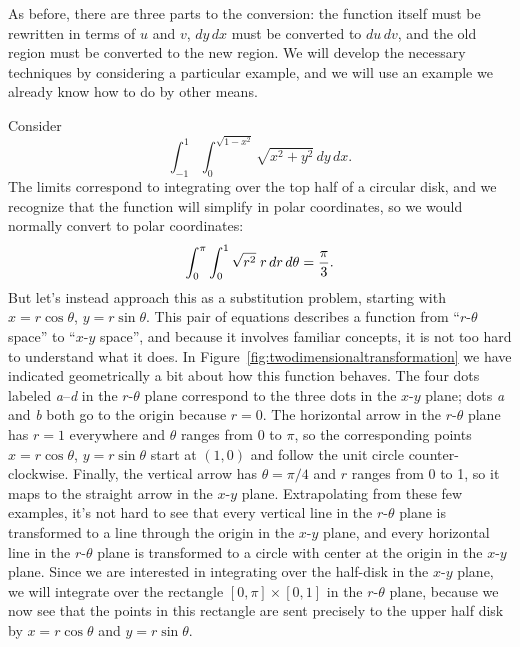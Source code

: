 As before, there are three parts to the conversion: the function
itself must be rewritten in terms of $u$ and $v$, $dy\,dx$ must be
converted to $du\,dv$, and the old region must be converted to the new
region. We will develop the necessary techniques by considering a
particular example, and we will use an example we already know how to
do by other means.

Consider 
\[\int_{-1}^1\int_0^{\sqrt{1-x^2}} \sqrt{x^2+y^2}\,dy\,dx.\]
The limits correspond to integrating over the top half of a circular
disk, and we recognize that the function will simplify in polar
coordinates, so we would normally convert to polar coordinates:
\[\int_{0}^\pi\int_0^1 \sqrt{r^2}\;r\,dr\,d\theta={\pi\over3}.\]
But let's instead approach this as a substitution problem, starting
with $x=r\cos\theta$, $y=r\sin\theta$. This pair of equations
describes a function from ``$r$-$\theta$ space'' to ``$x$-$y$ space'',
and because it involves familiar concepts, it is not too hard to
understand what it does. In Figure~\ref{fig:twodimensionaltransformation}
we have indicated geometrically a bit about how this
function behaves. The four dots labeled \emph{a}--\emph{d} in the $r$-$\theta$ plane
correspond to the three dots in the $x$-$y$ plane; dots \emph{a} and 
\emph{b} both go to the origin because $r=0$. The horizontal arrow in the
$r$-$\theta$ plane has $r=1$ everywhere and $\theta$ ranges from 0 to
$\pi$, so the corresponding points 
$x=r\cos\theta$, $y=r\sin\theta$ start at $(1,0)$ and follow the unit
circle counter-clockwise. Finally, the vertical arrow has
$\theta=\pi/4$ and $r$ ranges from 0 to 1, so it maps to the straight
arrow in the $x$-$y$ plane. Extrapolating from these few examples,
it's not hard to see that every vertical line in the $r$-$\theta$ plane
is transformed to a line through the origin in the $x$-$y$ plane, and
every horizontal line in the $r$-$\theta$ plane
is transformed to a circle with center at the origin in the $x$-$y$
plane. Since we are interested in integrating over the half-disk in
the $x$-$y$ plane, we will integrate over the rectangle
$[0,\pi]\times[0,1]$ in the $r$-$\theta$ plane, because we now see
that the points in this rectangle are sent precisely to the upper half
disk by $x=r\cos\theta$ and $y=r\sin\theta$.

